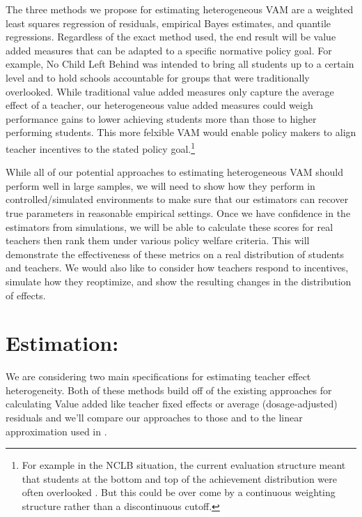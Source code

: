 \documentclass[letterpaper,12pt]{article}
\begin{document}
The three methods we propose for estimating heterogeneous VAM are a weighted least squares regression of residuals, empirical Bayes estimates, and quantile regressions. Regardless of the exact method used, the end result will be value added measures that can be adapted to a specific normative policy goal. For example, No Child Left Behind was intended to bring all students up to a certain level and to hold schools accountable for groups that were traditionally overlooked. While traditional value added measures only capture the average effect of a teacher, our heterogeneous value added measures could weigh performance gains to lower achieving students more than those to higher performing students. This more felxible VAM would enable policy makers to align teacher incentives to the stated policy goal.\footnote{For example in the NCLB situation, the current evaluation structure meant that students at the bottom and top of the achievement distribution were often overlooked \citep{neal2010left}. But this could be over come by a continuous weighting structure rather than a discontinuous cutoff.} 

While all of our potential approaches to estimating heterogeneous VAM should perform well in large samples, we will need to show how they perform in controlled/simulated environments to make sure that our estimators can recover true parameters in reasonable empirical settings. Once we have confidence in the estimators from simulations, we will be able to calculate these scores for real teachers then rank them under various policy welfare criteria. This will demonstrate the effectiveness of these metrics on a real distribution of students and teachers.  We would also like to consider how teachers respond to incentives, simulate how they reoptimize, and show the resulting changes in the distribution of effects.


\section{Estimation:}
We are considering two main specifications for estimating teacher effect heterogeneity. Both of these methods build off of the existing approaches for calculating Value added like teacher fixed effects or average (dosage-adjusted) residuals and we'll compare our approaches to those and to the linear approximation used in \citet{lockwood2007sensitivity}.
\end{document}
